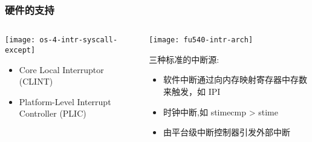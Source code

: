 \begin{frame}[plain]
	\frametitle{硬件的支持}
	\begin{columns}
		
		\begin{column}{0.45\textwidth}
			\centering
			\texttt{[image: os-4-intr-syscall-except]}
			\begin{itemize} \small
				\item Core Local	Interruptor (CLINT)
				\item Platform-Level Interrupt Controller (PLIC)
			\end{itemize}
			
		\end{column}
		
		\begin{column}{0.5\textwidth}
			
			\texttt{[image: fu540-intr-arch]}	
			
			三种标准的中断源:
			\begin{itemize}
				\item 软件中断通过向内存映射寄存器中存数来触发，如 IPI \pause
				\item 时钟中断,如 stimecmp > stime  \pause
				\item 由平台级中断控制器引发外部中断
			\end{itemize}		
			
		\end{column}
		
	\end{columns}
	
\end{frame}



